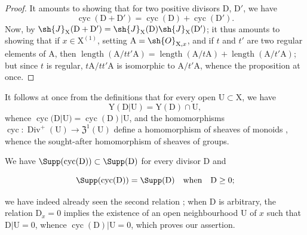 \begin{proof}
It amounts to showing that for two positive divisors $\mathrm{D}$, $\mathrm{D}'$, we have
\[
  \operatorname{cyc}(\mathrm{D}+\mathrm{D}')=\operatorname{cyc}(\mathrm{D})+\operatorname{cyc}(\mathrm{D}').
\]
Now, by  $\sh{J}_\mathrm{X}(\mathrm{D}+\mathrm{D}')=\sh{J}_\mathrm{X}(\mathrm{D})\sh{J}_\mathrm{X}(\mathrm{D}')$;
it thus amounts to showing that if $x\in\mathrm{X}^{(1)}$, setting $\mathrm{A}=\sh{O}_{\mathrm{X},x}$, and if $t$ and $t'$ are two regular elements of $\mathrm{A}$, then $\operatorname{length}(\mathrm{A}/tt'\mathrm{A})=\operatorname{length}(\mathrm{A}/t\mathrm{A})+\operatorname{length}(\mathrm{A}/t'\mathrm{A})$;
but since $t$ is regular, $t\mathrm{A}/tt'\mathrm{A}$ is isomorphic to $\mathrm{A}/t'\mathrm{A}$, whence the proposition at once.
\end{proof}

It follows at once from the definitions that for every open $\mathrm{U}\subset\mathrm{X}$, we have
\[
  \mathrm{Y}(\mathrm{D}|\mathrm{U})=\mathrm{Y}(\mathrm{D})\cap\mathrm{U},
\]
whence $\operatorname{cyc}(\mathrm{D}|\mathrm{U})=\operatorname{cyc}(\mathrm{D})|\mathrm{U}$, and the homomorphisms $\operatorname{cyc}:\operatorname{Div}^+(\mathrm{U})\to\mathfrak{Z}^1(\mathrm{U})$ define a homomorphism of sheaves of monoids , whence the sought-after homomorphism  of sheaves of groups.

We have $\Supp(\operatorname{cyc}(\mathrm{D}))\subset\Supp(\mathrm{D})$ for every divisor $\mathrm{D}$ and
\begin{env}[21.6.6.2]
\label{IV.21.6.6.2}
\[
  \Supp(\operatorname{cyc}(\mathrm{D}))=\Supp(\mathrm{D})\quad\text{when}\quad\mathrm{D}\geq 0;
\]
\end{env}
we have indeed already seen the second relation ;
when $\mathrm{D}$ is arbitrary, the relation $\mathrm{D}_x=0$ implies the existence of an open neighbourhood $\mathrm{U}$ of $x$ such that $\mathrm{D}|\mathrm{U}=0$, whence $\operatorname{cyc}(\mathrm{D})|\mathrm{U}=0$, which proves our assertion.

